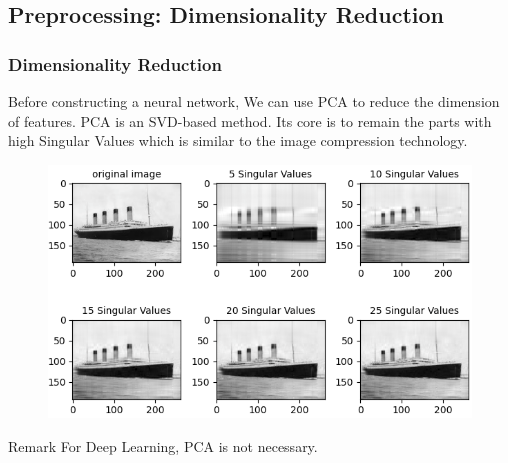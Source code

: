 \documentclass{beamer}
\begin{document}
\subsection{Preprocessing: Dimensionality Reduction}
\begin{frame}
	\frametitle{Dimensionality Reduction}
	\begin{flushleft}
		Before constructing a neural network, We can use PCA to reduce the dimension of features. PCA is an SVD-based method. Its core is to remain the parts with high Singular Values which is similar to the image compression technology.
	\end{flushleft}
	\begin{center}
			\begin{figure}
		    \includegraphics[width=0.5\linewidth]{./src/figures/11.png}
		  \end{figure}
		\end{center}
	\begin{block}{Remark}
		For Deep Learning, PCA is not necessary.
	\end{block}
\end{frame}

\end{document}
